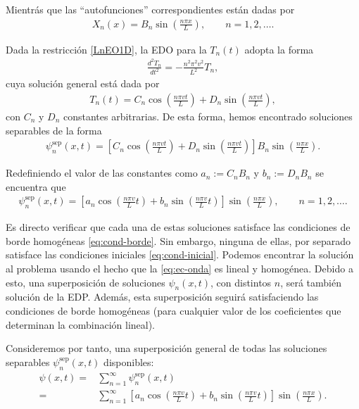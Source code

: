 Mientrás que las ``autofunciones'' correspondientes están dadas por
\begin{align}
    X_{n}(x)=B_n\sin\left(\frac{n \pi x}{L}\right),\qquad n=1,2,\hdots.
\end{align}

Dada la restricción \eqref{LnEO1D}, la EDO para la $T_{n}(t)$ adopta la forma
\begin{align}
    \frac{d^2 T_{n}}{dt^2}=-\frac{n^2 \pi^2v^2}{L^2}T_{n},
\end{align}
cuya solución general está dada por
\begin{align}
    T_{n}(t)=C_{n}\cos\left(\frac{n \pi vt}{L}\right)+D_{n}\sin\left(\frac{n\pi vt}{L}\right),
\end{align}
con $C_{n}$ y $D_{n}$ constantes arbitrarias. De esta forma, hemos encontrado soluciones separables de la forma
\begin{align}
    \psi^\text{sep}_n(x,t)=\left[C_{n}\cos\left(\frac{n \pi vt}{L}\right)+D_{n}\sin\left(\frac{n\pi vt}{L}\right) \right]B_{n}\sin\left(\frac{n \pi x}{L}\right).
\end{align}

Redefiniendo el valor de las constantes como $a_{n}:=C_{n}B_{n}$ y $b_{n}:=D_{n}B_{n}$ se encuentra que
\begin{align}
    \psi^\text{sep}_{n}(x,t)=\left[a_{n}\cos\left(\frac{n \pi v}{L}t\right)+b_{n}\sin\left(\frac{n \pi v}{L}t\right)\right] \sin\left(\frac{n\pi x}{L}\right), \qquad n=1,2,\dots.
\end{align}

Es directo verificar que cada una de estas soluciones satisface las condiciones de borde homogéneas \eqref{eq:cond-borde}. Sin embargo, ninguna de ellas, por separado satisface las condiciones iniciales \eqref{eq:cond-inicial}. Podemos encontrar la solución al problema usando el hecho que la \eqref{eq:ec-onda} es lineal y homogénea. Debido a esto, una superposición de soluciones $\psi_{n}(x,t)$, con distintos $n$, será también solución de la EDP. Además, esta superposición seguirá satisfaciendo las condiciones de borde homogéneas (para cualquier valor de los coeficientes que determinan la combinación lineal).

Consideremos por tanto, una superposición general de todas las soluciones separables $\psi^\text{sep}_{n}(x,t)$ disponibles:
\begin{align}
    \psi(x,t)= & \sum_{n=1}^{\infty}\psi^\text{sep}_{n}(x,t)                                                                                                           \\
    =          & \sum_{n=1}^{\infty}\left[a_{n}\cos\left(\frac{n \pi v}{L}t\right)+b_{n}\sin\left(\frac{n \pi v}{L}t\right)\right] \sin\left(\frac{n\pi x}{L}\right).
\end{align}

